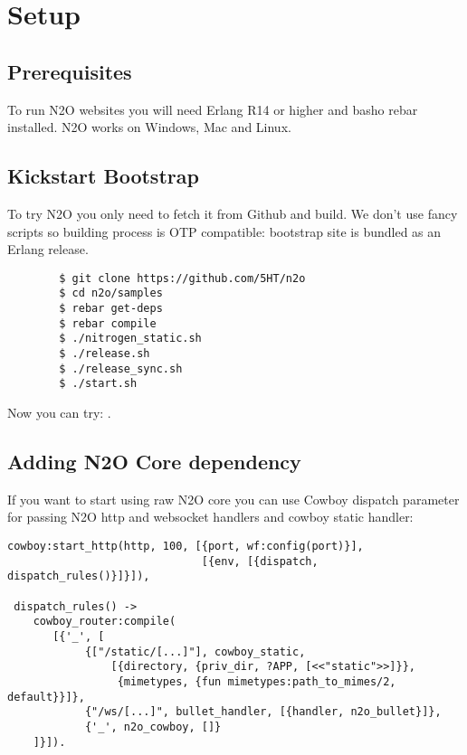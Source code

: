 \section{Setup}

\subsection{Prerequisites}
To run N2O websites you will need Erlang R14 or higher and basho rebar installed.
N2O works on Windows, Mac and Linux.

\subsection{Kickstart Bootstrap}
To try N2O you only need to fetch it from Github and build. We don't use
fancy scripts so building process is OTP compatible: bootstrap site
is bundled as an Erlang release.

\vspace{1\baselineskip}
\begin{lstlisting}
        $ git clone https://github.com/5HT/n2o
        $ cd n2o/samples
        $ rebar get-deps
        $ rebar compile
        $ ./nitrogen_static.sh
        $ ./release.sh
        $ ./release_sync.sh
        $ ./start.sh
\end{lstlisting}
\vspace{1\baselineskip}

Now you can try: .

\newpage
\subsection{Adding N2O Core dependency}
If you want to start using raw N2O core you can use Cowboy dispatch parameter
for passing N2O http and websocket handlers and cowboy static handler:

\begin{lstlisting}[caption=web\_sup.erl]
 cowboy:start_http(http, 100, [{port, wf:config(port)}],
                              [{env, [{dispatch, dispatch_rules()}]}]),

 dispatch_rules() ->
    cowboy_router:compile(
       [{'_', [
            {["/static/[...]"], cowboy_static,
                [{directory, {priv_dir, ?APP, [<<"static">>]}},
                 {mimetypes, {fun mimetypes:path_to_mimes/2, default}}]}, 
            {"/ws/[...]", bullet_handler, [{handler, n2o_bullet}]},
            {'_', n2o_cowboy, []}
    ]}]).
\end{lstlisting}

